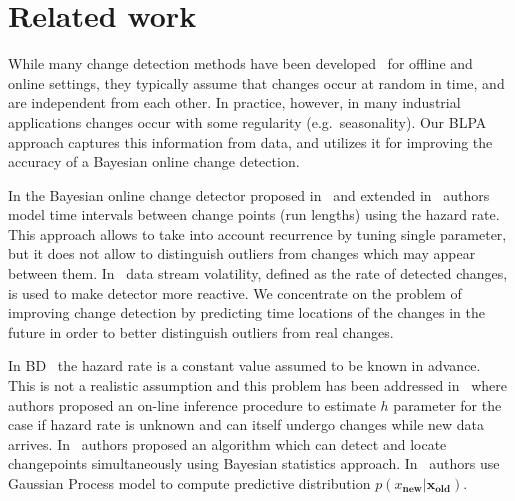 \section{Related work}
\label{sec:related_work}

While many change detection methods have been developed~\cite{Nikiforov,Polunchenko2011} for offline and online settings, they typically assume that changes occur at random in time, and are independent from each other.
In practice, however, in many industrial applications changes occur with some regularity (e.g.\ seasonality).
Our BLPA approach captures this information from data, and utilizes it for improving the accuracy of a Bayesian online change detection.

In the Bayesian online change detector proposed in~\cite{mackay2007} and extended in~\cite{Wilson2010a} authors model time intervals between change points (run lengths) using the hazard rate.
This approach allows to take into account recurrence by tuning single parameter, but it does not allow to distinguish outliers from changes which may appear between them.
In~\cite{huang2014detecting} data stream volatility, defined as the rate of detected changes, is used to make detector more reactive.
We concentrate on the problem of improving change detection by predicting time locations of the changes in the future in order to better distinguish outliers from real changes.

In BD~\cite{mackay2007} the hazard rate is a constant value assumed to be known in advance.
%
This is not a realistic assumption and this problem has been addressed in~\cite{WilsonBayesOnline} where authors proposed an on-line inference
procedure to estimate $h$ parameter for the case if hazard rate is unknown and can itself undergo changes while new data
arrives.
%
In~\cite{DowneyChp} authors proposed an algorithm 
which can detect and locate changepoints simultaneously using Bayesian statistics approach.
%
In~\cite{saatcci2010gaussian} authors use Gaussian Process model to compute predictive distribution $p(x_{\textbf{new}} | \pmb{x}_{\textbf{old}})$.

